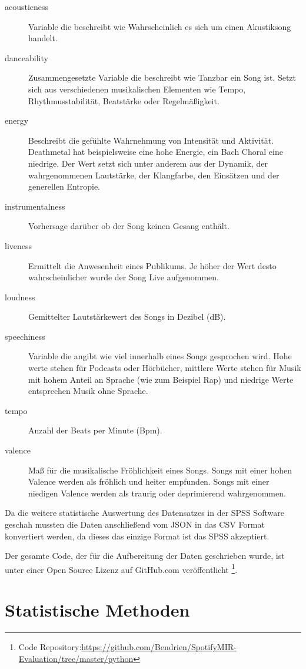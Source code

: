 \begin{description}
    \item[acousticness] Variable die beschreibt wie Wahrscheinlich es sich um einen Akustiksong handelt.
    \item[danceability] Zusammengesetzte Variable die beschreibt wie Tanzbar ein Song ist. Setzt sich aus verschiedenen musikalischen Elementen wie Tempo, Rhythmusstabilität, Beatstärke oder Regelmäßigkeit.
    \item[energy] Beschreibt die gefühlte Wahrnehmung von Intensität und Aktivität. Deathmetal hat beispielsweise eine hohe Energie, ein Bach Choral eine niedrige. Der Wert setzt sich unter anderem aus der Dynamik, der wahrgenommenen Lautstärke, der Klangfarbe, den Einsätzen und der generellen Entropie.
    \item[instrumentalness] Vorhersage darüber ob der Song keinen Gesang enthält.
    \item[liveness] Ermittelt die Anwesenheit eines Publikums. Je höher der Wert desto wahrscheinlicher wurde der Song Live aufgenommen.
    \item[loudness] Gemittelter Lautstärkewert des Songs in Dezibel (dB).
    \item[speechiness] Variable die angibt wie viel innerhalb eines Songs gesprochen wird. Hohe werte stehen für Podcasts oder Hörbücher, mittlere Werte stehen für Musik mit hohem Anteil an Sprache (wie zum Beispiel Rap) und niedrige Werte entsprechen Musik ohne Sprache.
    \item[tempo] Anzahl der Beats per Minute (Bpm).
    \item[valence] Maß für die musikalische Fröhlichkeit eines Songs. Songs mit einer hohen Valence werden als fröhlich und heiter empfunden. Songs mit einer niedigen Valence werden als traurig oder deprimierend wahrgenommen.
\end{description}

Da die weitere statistische Auswertung des Datensatzes in der SPSS Software geschah mussten die Daten anschließend vom JSON in das CSV Format konvertiert werden, da dieses das einzige Format ist das SPSS akzeptiert.

Der gesamte Code, der für die Aufbereitung der Daten geschrieben wurde, ist unter einer Open Source Lizenz auf GitHub.com veröffentlicht \footnote{Code Repository:\hfill \url{https://github.com/Bendrien/SpotifyMIR-Evaluation/tree/master/python}}.



\section*{Statistische Methoden}
\label{sec:Statistische Methoden}


